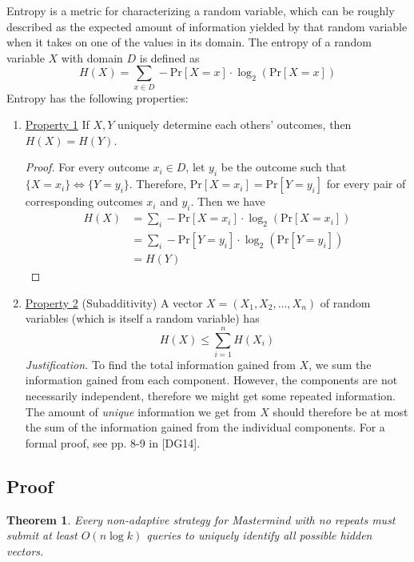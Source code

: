 \documentclass[12pt, a4paper]{article}
\newtheorem{theorem}{Theorem}
\begin{document}
Entropy is a metric for characterizing a random variable, which can be roughly
described as the expected amount of information yielded by that random variable when
it takes on one of the values in its domain. The entropy of a random variable $X$ with
domain $D$ is defined as
	\begin{equation*}
	H(X) = \sum_{x\in D}-\text{Pr}[X=x]\cdot\log_2\left(\text{Pr}[X=x]\right)
	\end{equation*}
Entropy has the following properties:
	\begin{enumerate}[label=]
	\item\underline{Property 1} If $X,Y$ uniquely determine each others'
	outcomes, then $H(X)=H(Y)$.
		\begin{proof}
		For every outcome $x_i\in D$, let $y_i$ be the outcome such that $\{X=x_i\}
		\Leftrightarrow \{Y=y_i\}$. Therefore,
		$\text{Pr}[X=x_i]=\text{Pr}[Y=y_i]$ for every pair of corresponding outcomes
		$x_i$ and $y_i$. Then we have
			\begin{align*}
			H(X) & = \sum_{i}-\text{Pr}[X=x_i]\cdot\log_2(\text{Pr}[X=x_i])\\
			& = \sum_{i}-\text{Pr}[Y=y_i]\cdot\log_2(\text{Pr}[Y=y_i])\\
			& = H(Y)
			\end{align*}
		\end{proof}
		
	\item\underline{Property 2} (Subadditivity) A vector $X=(X_1, X_2, \ldots, X_n)$
	of random variables (which is itself a random variable) has
		\begin{equation*}
		H(X)\le \sum_{i=1}^{n}H(X_i)
		\end{equation*}
	\textit{Justification.} To find the total information gained from $X$, we sum
	the information gained from each component. However, the components are not
	necessarily independent, therefore we might get some repeated information. The
	amount of \textit{unique} information we get from $X$ should therefore be
	at most the sum of the information gained from the individual components. For
	a formal proof, see pp. 8-9 in [DG14].
	\end{enumerate}

\subsection*{Proof}
\begin{theorem}
Every non-adaptive strategy for Mastermind with no repeats must submit at least
$O(n \log k)$ queries to uniquely identify all possible hidden vectors.
\end{theorem}
\end{document}
